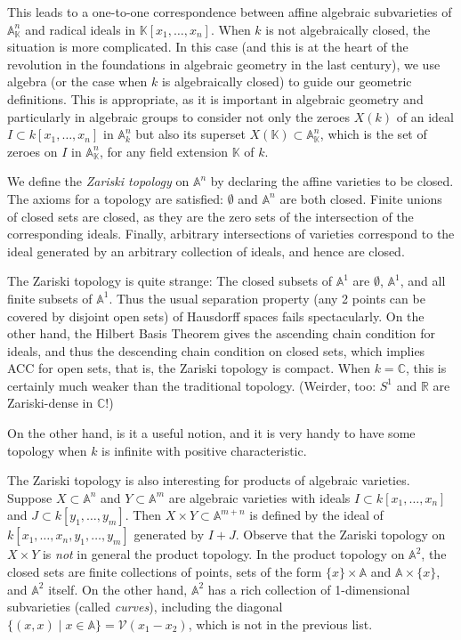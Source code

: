 \documentclass[12pt]{amsart}
\begin{document}
This leads to a one-to-one correspondence between affine algebraic
subvarieties of ${\mathbb A}^n_{\mathbb K}$ and radical ideals in 
${\mathbb K}[x_1,\ldots,x_n]$.
When $k$ is not algebraically closed, the situation is more complicated.
In this case (and this is at the heart of the revolution in the foundations
in algebraic geometry in the last century),
we use algebra (or the case when $k$ is algebraically closed) to guide our
geometric definitions. 
This is appropriate, as it is important in algebraic geometry and
particularly in algebraic groups to consider not only the zeroes $X(k)$ of an
ideal $I\subset k[x_1,\ldots,x_n]$ in ${\mathbb A}^n_k$ but also its
superset $X({\mathbb K})\subset {\mathbb A}^n_{\mathbb K}$, which is the set
of zeroes on $I$ in ${\mathbb A}^n_{\mathbb K}$, for any field extension
${\mathbb K}$ of $k$.
\medskip

We define the {\it Zariski topology} on ${\mathbb A}^n$ by declaring the
affine varieties to be closed.
The axioms for a topology are satisfied:
$\emptyset$ and ${\mathbb A}^n$ are both closed. Finite unions of closed
sets are closed, as they are the zero sets of the intersection of the
corresponding ideals.
Finally, arbitrary intersections of varieties correspond to the ideal
generated by an arbitrary collection of ideals, and hence are closed.

The Zariski topology is quite strange:
The closed subsets of ${\mathbb A}^1$ are $\emptyset$, ${\mathbb A}^1$, and
all finite subsets of ${\mathbb A}^1$.
Thus the usual separation property (any 2 points can be covered by disjoint
open sets) of Hausdorff spaces fails 
spectacularly.
On the other hand, the Hilbert Basis Theorem gives the ascending chain
condition for ideals, and thus the descending chain
condition on closed sets, which implies ACC for open sets, that is, 
the Zariski topology is  compact.
When $k={\mathbb C}$, this is certainly much weaker than the traditional
topology. 
(Weirder, too: $S^1$ and ${\mathbb R}$ are Zariski-dense in ${\mathbb C}$!)

On the other hand, is it a useful notion, and it is very handy to have some
topology when $k$ is infinite with positive characteristic.\smallskip

The Zariski topology is also interesting for products of algebraic
varieties. 
Suppose $X\subset{\mathbb A}^n$ and $Y\subset{\mathbb A}^m$ are algebraic
varieties with ideals $I\subset k[x_1,\ldots,x_n]$ and 
$J\subset k[y_1,\ldots,y_m]$.
Then $X\times Y\subset {\mathbb A}^{m+n}$ is defined by the ideal of
$k[x_1,\ldots,x_n,y_1,\ldots,y_m]$ generated by $I+J$.
Observe that the Zariski topology on $X\times Y$ is {\it not} in general the
product topology.
In the product topology on ${\mathbb A}^2$, the closed sets are finite
collections of points, sets of the form $\{x\}\times{\mathbb A}$ and 
${\mathbb A}\times\{x\}$, and ${\mathbb A}^2$ itself.
On the other hand, ${\mathbb A}^2$ has a rich collection of 1-dimensional
subvarieties (called {\sl curves}), including the diagonal 
$\{(x,x)\mid x\in{\mathbb A}\}={\mathcal V}(x_1-x_2)$, which is not in the
previous list.
\medskip
\end{document}
